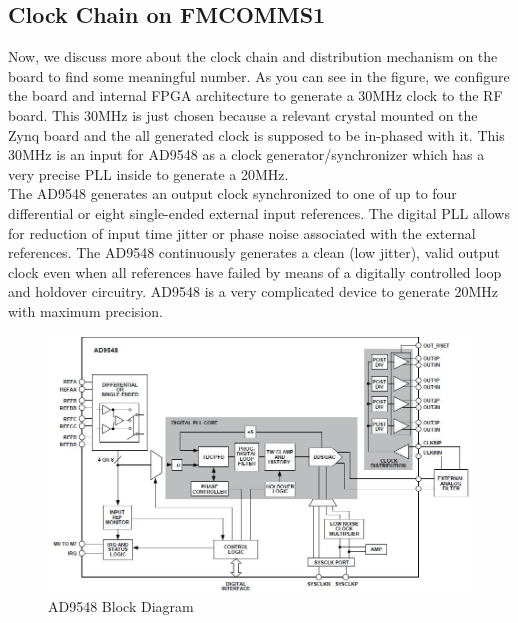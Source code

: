 \subsection{Clock Chain on FMCOMMS1}
Now, we discuss more about the clock chain and distribution mechanism on the board to find some meaningful number. As you can see in the figure, we configure the board and internal FPGA architecture to generate a 30MHz clock to the RF board. This 30MHz is just chosen because a relevant crystal mounted on the Zynq board and the all generated clock is supposed to be in-phased with it. This 30MHz is an input for AD9548 as a clock generator/synchronizer \cite{ad9548} which has a very precise PLL inside to generate a 20MHz.\\
The AD9548 generates an output clock synchronized to one of up to four differential or eight single-ended external input references. The digital PLL allows for reduction of input time jitter or phase noise associated with the external references. The AD9548 continuously generates a clean (low jitter), valid output clock even when all references have failed by means of a digitally controlled loop and holdover circuitry. AD9548 is a very complicated device to generate 20MHz with maximum precision.\\

\begin{figure}
\centering
\includegraphics[width=15cm]{content/fig/ad9548BlockDiagram.JPG}
\caption{AD9548 Block Diagram}
\label{fig:ad9548}
\end{figure}

